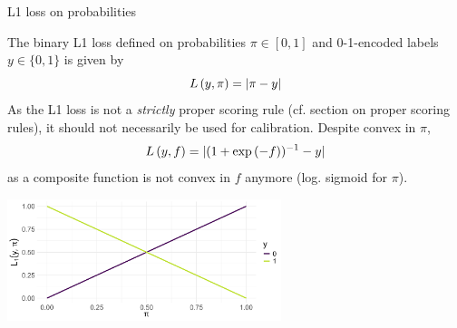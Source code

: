 \documentclass[11pt,compress,t,notes=noshow, xcolor=table]{beamer}
\begin{document}
\begin{vbframe}{L1 loss on probabilities}

The binary L1 loss defined on probabilities $\pi \in [0, 1]$ and 0-1-encoded labels $y \in \{0, 1\}$ is given by
\begin{equation*}
L\left(y, \pi\right) = |\pi - y|
\end{equation*}
As the L1 loss is not a \textit{strictly} proper scoring rule (cf. section on proper scoring rules), it should not necessarily be used for calibration. %
Despite convex in $\pi$, $$L\left(y, f\right)=|(1+\exp{(-f)})^{-1}-y|$$ as a composite function is not convex in $f$ anymore (log. sigmoid for $\pi$).
\vspace{-0.2cm}
\begin{center}
\includegraphics[width = 0.6\textwidth]{figure/l1_loss.png}
\end{center}


\end{vbframe}





\endlecture
\end{document}
